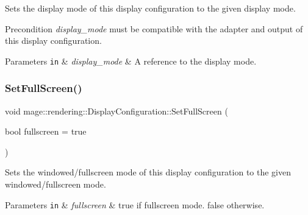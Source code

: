 Sets the display mode of this display configuration to the given display mode.

\begin{DoxyPrecond}{Precondition}
{\itshape display\+\_\+mode} must be compatible with the adapter and output of this display configuration. 
\end{DoxyPrecond}

\begin{DoxyParams}[1]{Parameters}
\mbox{\tt in}  & {\em display\+\_\+mode} & A reference to the display mode. \\
\hline
\end{DoxyParams}
\mbox{\label{classmage_1_1rendering_1_1_display_configuration_a5e15cc1ca56718a7892b80cd0a1d20c0}} 
\subsubsection{\texorpdfstring{Set\+Full\+Screen()}{SetFullScreen()}}
{\footnotesize\ttfamily void mage\+::rendering\+::\+Display\+Configuration\+::\+Set\+Full\+Screen (\begin{DoxyParamCaption}\item[{bool}]{fullscreen = {\ttfamily true} }\end{DoxyParamCaption})\hspace{0.3cm}{\ttfamily [noexcept]}}

Sets the windowed/fullscreen mode of this display configuration to the given windowed/fullscreen mode.


\begin{DoxyParams}[1]{Parameters}
\mbox{\tt in}  & {\em fullscreen} & {\ttfamily true} if fullscreen mode. {\ttfamily false} otherwise. \\
\hline
\end{DoxyParams}
\mbox{\label{classmage_1_1rendering_1_1_display_configuration_a304a29762afd99caa1672ef6cc259fb3}} 
